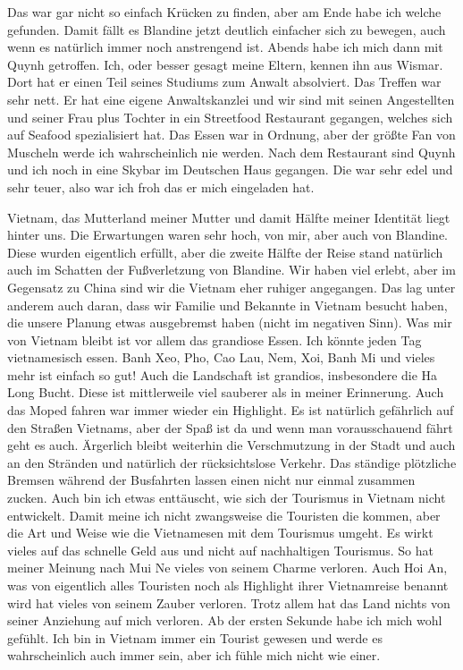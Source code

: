 \documentclass[11pt]{book}
\begin{document}
Das war gar nicht so einfach Krücken zu finden, aber am Ende habe ich welche gefunden. Damit fällt es Blandine jetzt deutlich einfacher
sich zu bewegen, auch wenn es natürlich immer noch anstrengend ist. Abends habe ich mich dann mit Quynh getroffen. Ich, oder besser 
gesagt meine Eltern, kennen ihn aus Wismar. Dort hat er einen Teil seines Studiums zum Anwalt absolviert. Das Treffen war sehr 
nett. Er hat eine eigene Anwaltskanzlei und wir sind mit seinen Angestellten und seiner Frau plus Tochter in ein Streetfood 
Restaurant gegangen, welches sich auf Seafood spezialisiert hat. Das Essen war in Ordnung, aber der größte Fan von Muscheln werde
ich wahrscheinlich nie werden. Nach dem Restaurant sind Quynh und ich noch in eine Skybar im Deutschen Haus gegangen. Die war sehr edel 
und sehr teuer, also war ich froh das er mich eingeladen hat. 

Vietnam, das Mutterland meiner Mutter und damit Hälfte meiner Identität liegt hinter uns. Die Erwartungen waren sehr hoch, von 
mir, aber auch von Blandine. Diese wurden eigentlich erfüllt, aber die zweite Hälfte der Reise stand natürlich auch im Schatten 
der Fußverletzung von Blandine. Wir haben viel erlebt, aber im Gegensatz zu China sind wir die Vietnam eher ruhiger angegangen.
Das lag unter anderem auch daran, dass wir Familie und Bekannte in Vietnam besucht haben, die unsere Planung etwas ausgebremst 
haben (nicht im negativen Sinn). Was mir von Vietnam bleibt ist vor allem das grandiose Essen. Ich könnte jeden Tag vietnamesisch 
essen. Banh Xeo, Pho, Cao Lau, Nem, Xoi, Banh Mi und vieles mehr ist einfach so gut! Auch die Landschaft ist grandios, insbesondere 
die Ha Long Bucht. Diese ist mittlerweile viel sauberer als in meiner Erinnerung. Auch das Moped fahren war immer wieder ein Highlight.
Es ist natürlich gefährlich auf den Straßen Vietnams, aber der Spaß ist da und wenn man vorausschauend fährt geht es auch. Ärgerlich 
bleibt weiterhin die Verschmutzung in der Stadt und auch an den Stränden und natürlich der rücksichtslose Verkehr. Das ständige 
plötzliche Bremsen während der Busfahrten lassen einen nicht nur einmal zusammen zucken. Auch bin ich etwas enttäuscht, wie sich 
der Tourismus in Vietnam nicht entwickelt. Damit meine ich nicht zwangsweise die Touristen die kommen, aber die Art und Weise 
wie die Vietnamesen mit dem Tourismus umgeht. Es wirkt vieles auf das schnelle Geld aus und nicht auf nachhaltigen Tourismus.
So hat meiner Meinung nach Mui Ne vieles von seinem Charme verloren. Auch Hoi An, was von eigentlich alles Touristen noch als 
Highlight ihrer Vietnamreise benannt wird hat vieles von seinem Zauber verloren. 
Trotz allem hat das Land nichts von seiner Anziehung auf mich verloren. Ab der ersten Sekunde habe ich mich wohl gefühlt. Ich bin 
in Vietnam immer ein Tourist gewesen und werde es wahrscheinlich auch immer sein, aber ich fühle mich nicht wie einer. 
\end{document}
